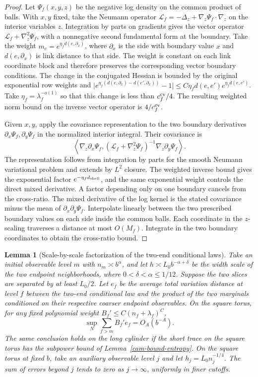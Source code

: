 \documentclass[11pt,a4paper]{article}
\newtheorem{lemma}[theorem]{Lemma}
\numberwithin{equation}{section}
\begin{document}
\begin{proof}
Let \(\Psi_f(x,y,z)\) be the negative log density on the common product of balls. With \(x,y\) fixed, take the Neumann operator \(\mathcal L_f=-\Delta_z+\nabla_z\Psi_f\cdot\nabla_z\) on the interior variables \(z\). Integration by parts on gradients gives the vector operator \(\mathcal L_f+\nabla_z^2\Psi_f\), with a nonnegative second fundamental form at the boundary. Take the weight \(m_e=e^{\eta_f d(e,\partial_x)}\), where \(\partial_x\) is the side with boundary value \(x\) and \(d(e,\partial_x)\) is link distance to that side. The weight is constant on each link coordinate block and therefore preserves the corresponding vector boundary conditions. The change in the conjugated Hessian is bounded by the original exponential row weights and
\(\big|e^{\eta_f(d(e,\partial_x)-d(e',\partial_x))}-1\big|\le C\eta_f d(e,e')e^{\eta_f d(e,e')}\).
Take \(\eta_f=\lambda_f^{-o(1)}\) so that this change is less than \(c_f^{\rm cv}/4\). The resulting weighted norm bound on the inverse vector operator is \(4/c_f^{\rm cv}\).

Given \(x,y\), apply the covariance representation to the two boundary derivatives \(\partial_x\Psi_f,\partial_y\Psi_f\) in the normalized interior integral. Their covariance is
\[
 \left\langle\nabla_z\partial_x\Psi_f,
 (\mathcal L_f+\nabla_z^2\Psi_f)^{-1}\nabla_z\partial_y\Psi_f\right\rangle .
\]
The representation follows from integration by parts for the smooth Neumann variational problem and extends by \(L^2\) closure. The weighted inverse bound gives the exponential factor \(e^{-\eta_f d_{\rm shell}}\), and the same exponential weight controls the direct mixed derivative. A factor depending only on one boundary cancels from the cross-ratio. The mixed derivative of the log kernel is the stated covariance minus the mean of \(\partial_x\partial_y\Psi_f\). Interpolate linearly between the two prescribed boundary values on each side inside the common balls. Each coordinate in the \(z\)-scaling traverses a distance at most \(O(M_f)\). Integrate in the two boundary coordinates to obtain the cross-ratio bound.
\end{proof}
\begin{lemma}[Scale-by-scale factorization of the two-end conditional laws]\label{cam-bound-backward}
Take an initial observable level \(m\) with \(n_m\asymp b^\alpha\), and let \(h\asymp L_0b^{-\alpha+\delta}\) be the width scale of the two endpoint neighborhoods, where \(0<\delta<\alpha\le1/12\). Suppose the two slices are separated by at least \(L_0/2\). Let \(e_f\) be the average total variation distance at level \(f\) between the two-end conditional law and the product of the two marginals conditioned on their respective coarser endpoint observables. On the square torus, for any fixed polynomial weight \(B_f'\le C(n_f+\lambda_f)^C\),
\[
 \sup_N\sum_{f>m}B_f'e_f=O_A(b^{-A}) .
\]
The same conclusion holds on the long cylinder if the short trace on the square torus has the subpower bound of Lemma~\ref{cam-bound-entropy}. On the square torus at fixed \(b\), take an auxiliary observable level \(j\) and let \(h_j=L_0n_j^{-1/4}\). The sum of errors beyond \(j\) tends to zero as \(j\to\infty\), uniformly in finer cutoffs.
\end{lemma}
\end{document}
